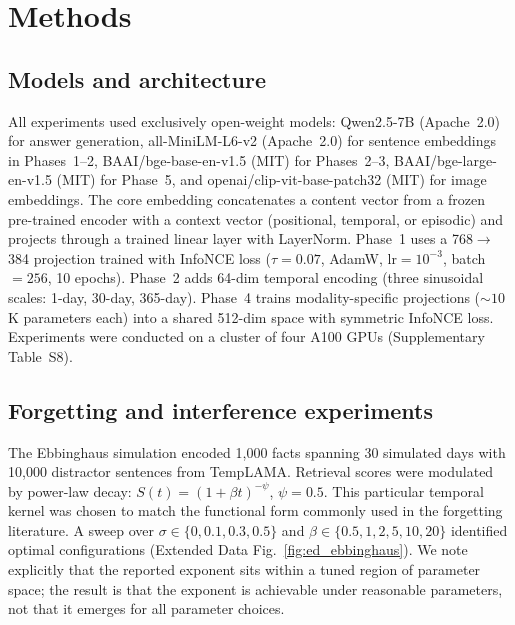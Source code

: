 \documentclass[11pt]{article}
\begin{document}
\section*{Methods}

\subsection*{Models and architecture}

All experiments used exclusively open-weight models: Qwen2.5-7B\cite{qwen2024} (Apache~2.0) for answer generation, all-MiniLM-L6-v2\cite{reimers2019} (Apache~2.0) for sentence embeddings in Phases~1--2, BAAI/bge-base-en-v1.5\cite{xiao2023} (MIT) for Phases~2--3, BAAI/bge-large-en-v1.5\cite{xiao2023} (MIT) for Phase~5, and openai/clip-vit-base-patch32\cite{radford2021} (MIT) for image embeddings. The core embedding concatenates a content vector from a frozen pre-trained encoder with a context vector (positional, temporal, or episodic) and projects through a trained linear layer with LayerNorm. Phase~1 uses a 768$\to$384 projection trained with InfoNCE loss ($\tau = 0.07$, AdamW, lr$=10^{-3}$, batch$=256$, 10 epochs). Phase~2 adds 64-dim temporal encoding (three sinusoidal scales: 1-day, 30-day, 365-day). Phase~4 trains modality-specific projections (${\sim}10$K parameters each) into a shared 512-dim space with symmetric InfoNCE loss. Experiments were conducted on a cluster of four A100 GPUs (Supplementary Table~S8).

\subsection*{Forgetting and interference experiments}

The Ebbinghaus simulation encoded 1{,}000 facts spanning 30 simulated days with 10{,}000 distractor sentences from TempLAMA. Retrieval scores were modulated by power-law decay: $S(t) = (1 + \beta t)^{-\psi}$, $\psi = 0.5$. This particular temporal kernel was chosen to match the functional form commonly used in the forgetting literature\cite{wixted1991}. A sweep over $\sigma \in \{0, 0.1, 0.3, 0.5\}$ and $\beta \in \{0.5, 1, 2, 5, 10, 20\}$ identified optimal configurations (Extended Data Fig.~\ref{fig:ed_ebbinghaus}). We note explicitly that the reported exponent sits within a tuned region of parameter space; the result is that the exponent is achievable under reasonable parameters, not that it emerges for all parameter choices.
\end{document}
